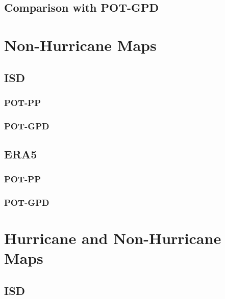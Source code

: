 \documentclass[12pt,oneside]{reedthesis}
\begin{document}
\hypertarget{comparison-with-pot-gpd}{%
\subsection{Comparison with POT-GPD}\label{comparison-with-pot-gpd}}

\hypertarget{non-hurricane-maps}{%
\section{Non-Hurricane Maps}\label{non-hurricane-maps}}

\hypertarget{isd-1}{%
\subsection{ISD}\label{isd-1}}

\hypertarget{pot-pp-1}{%
\subsubsection{POT-PP}\label{pot-pp-1}}

\hypertarget{pot-gpd-1}{%
\subsubsection{POT-GPD}\label{pot-gpd-1}}

\hypertarget{era5-1}{%
\subsection{ERA5}\label{era5-1}}

\hypertarget{pot-pp-2}{%
\subsubsection{POT-PP}\label{pot-pp-2}}

\hypertarget{pot-gpd-2}{%
\subsubsection{POT-GPD}\label{pot-gpd-2}}

\hypertarget{hurricane-and-non-hurricane-maps}{%
\section{Hurricane and Non-Hurricane Maps}\label{hurricane-and-non-hurricane-maps}}

\hypertarget{isd-2}{%
\subsection{ISD}\label{isd-2}}
\end{document}
